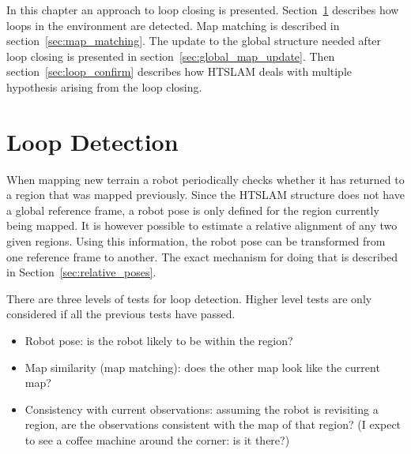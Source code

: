 In this chapter an approach to loop closing is presented.
Section~\ref{sec:loop_detection} describes how loops in the
environment are detected. Map matching is described in
section~\ref{sec:map_matching}. The update to the global structure
needed after loop closing is presented in
section~\ref{sec:global_map_update}. Then
section~\ref{sec:loop_confirm} describes how HTSLAM deals with
multiple hypothesis arising from the loop closing.


\section{Loop Detection}
\label{sec:loop_detection}



When mapping new terrain a robot periodically checks whether it has
returned to a region that was mapped previously. Since the HTSLAM
structure does not have a global reference frame, a robot pose is only
defined for the region currently being mapped. It is however possible
to estimate a relative alignment of any two given regions. Using this
information, the robot pose can be transformed from one reference frame
to another. The exact mechanism for doing that is described in
Section~\ref{sec:relative_poses}.

There are three levels of tests for loop detection. Higher level tests
are only considered if all the previous tests have passed.

\begin{itemize}
\item Robot pose: is the robot likely to be within the region?
\item Map similarity (map matching): does the other map look like
the current map?
\item Consistency with current observations: assuming the robot is
  revisiting a region, are the observations consistent with the map of
  that region? (I expect to see a coffee machine around the corner: is
  it there?)
\end{itemize}

